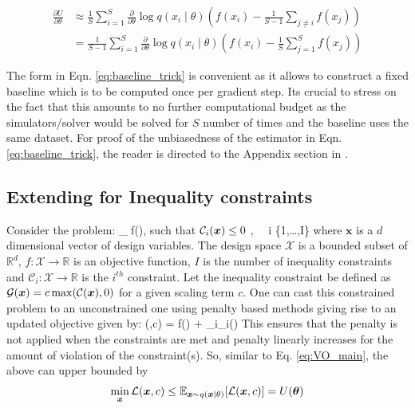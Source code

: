 \begin{align}
	\frac{\partial U}{\partial \theta} &\approx \frac{1}{S} \sum_{i=1}^{S}  \frac{\partial}{\partial \theta} \log q\left(x_i \mid \theta\right) \left(f(x_i)-\frac{1}{S-1} \sum_{j\neq i}f(x_j)\right)\\
	&= \frac{1}{S-1} \sum_{i=1}^{S}  \frac{\partial}{\partial \theta} \log q\left(x_i \mid \theta\right) \left(f(x_i)-\frac{1}{S} \sum_{j=1}^{S}f(x_j)\right) \label{eq:baseline_trick}
\end{align}

The form in Eqn. \ref{eq:baseline_trick} is convenient as it allows to construct a fixed baseline which is to be computed once per gradient step. Its crucial to stress on the fact that this amounts to no further computational budget as the simulators/solver would be solved for $S$ number of times and the baseline uses the same dataset. For proof of the unbiasedness of the estimator in Eqn.\ref{eq:baseline_trick}, the reader is directed to the Appendix section in \cite{kool_buy_2022}.

\subsection*{Extending for Inequality constraints}

Consider the problem:
\be
\min_{} f(), \qquad \textrm{ such that $\mathcal{C}_i(\bs{x})\leq 0$ },~~ \forall i \in \{1,\ldots,I\}  
\ee
where $\bm{x}$ is a $d$ dimensional vector of design variables. The design space $\mathcal{X}$ is a bounded subset of $\mathbb{R}^d$, $f:\mathcal{X} \rightarrow \mathbb{R}$ is an objective function, $I$ is the number of inequality constraints and $\mathcal{C}_{i} : \mathcal{X}\rightarrow \mathbb{R}$ is the $i^{th}$ constraint. Let the inequality constraint be defined as $\mathcal{G}(\bm{x}) = c \max(\mathcal{C}(\boldsymbol{x}),0)$ for a given scaling term $c$. One can cast this constrained problem to an unconstrained one using penalty based methods giving rise to an updated objective given by:
\be
{}(,c) = f() + \sum_{i}_i()
\ee
This ensures that the penalty is not applied when the constraints are met and penalty linearly increases for the amount of violation of the constraint(s). So, similar to Eq. \ref{eq:VO_main}, the above can upper bounded by
\begin{align}\label{eq:U_theta_constraint}
\min _{\boldsymbol{x}} \mathcal{L}(\boldsymbol{x},c) \leq \mathbb{E}_{\boldsymbol{x} \sim q(\boldsymbol{x} \mid \theta)}[\mathcal{L}(\boldsymbol{x},c)]=U(\boldsymbol{\theta})
\end{align}

